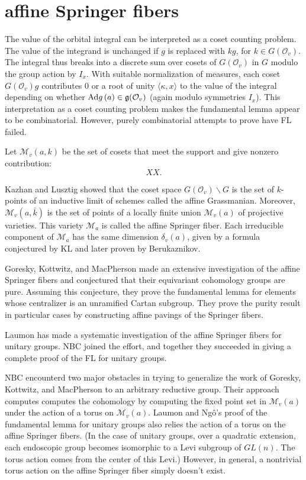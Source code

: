 \documentclass[brochure,english,12pt]{bourbaki}
\def\op#1{{\operatorname{#1}}}
\def\b{\backslash }
\def\g{\frak{g}}
\def\M{{\mathcal M}}
\def\O{{\mathcal O}}
\begin{document}
\section{affine Springer fibers}

The  value of the orbital integral
can be interpreted as a coset counting problem. 
The value of the integrand is unchanged if
$g$ is replaced with $k g$, for $k\in G(\O_v)$.  The integral thus
breaks into a discrete sum over cosets of $G(\O_v)$ in $G$ modulo the
group action by $I_x$.  With suitable normalization of measures, each
coset $G(\O_v)g$ contributes $0$ or a root of unity $\langle\kappa,x\rangle$ to
the value of the integral depending on whether $\op{Ad}g\,(a) \in
\g(\O_v)$ (again modulo symmetries $I_x$).   This interpretation 
as a coset counting problem makes the fundamental lemma appear to be
combinatorial.  However, purely combinatorial attempts to prove have FL failed.

Let $\M_v(a,k)$ be the set of cosets that meet the support and give nonzero contribution:
\[
XX.
\]

Kazhan and Lusztig showed that the coset space $G(\O_v)\b G$ is the set of
$k$-points of an inductive limit of schemes called the affine Grassmanian.   
Moreover, $\M_v(a,\bar k)$ is the set of points of a locally finite union
$\M_v(a)$ of projective varieties.  This variety $\M_a$ is called the affine Springer
fiber.  Each irreducible component of $\M_a$ has the same dimension
$\delta_v(a)$, given by a formula conjectured by KL and later proven by Berukaznikov.

Goresky, Kottwitz, and MacPherson made an extensive investigation of
the affine Springer fibers and conjectured that their equivariant
cohomology groups are pure.  Assuming this conjecture, they prove the
fundamental lemma for elements whose centralizer is an unramified
Cartan subgroup.  They prove the purity result in particular cases by
constructing affine pavings of the Springer fibers.

Laumon has made a systematic investigation of
the affine Springer fibers for unitary groups.  NBC joined the effort, and together they
succeeded in giving a complete proof of the FL for unitary groups.

NBC encounterd two major obstacles in trying to generalize the work of
Goresky, Kottwitz, and MacPherson to an arbitrary reductive group.
Their approach computes computes the cohomology by computing the fixed
point set in $\M_v(a)$ under the action of a torus on $\M_v(a)$.  Laumon and
Ng\^o's proof of the fundamental lemma for unitary groups also relies
the action of a torus on the affine Springer fibers.  (In the case of
unitary groups, over a quadratic extension, each
endoscopic group becomes isomorphic to a Levi subgroup of $GL(n)$.
The torus action comes from the center of this Levi.)  However, in
general, a nontrivial torus action on the affine Springer fiber simply
doesn't exist.
\end{document}
